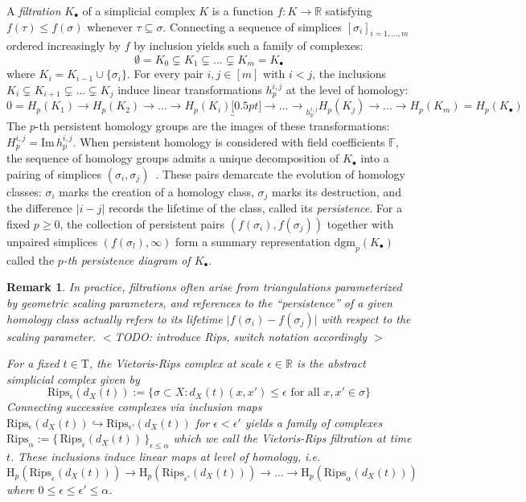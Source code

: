 \documentclass[10pt]{article}
\newtheorem{remark}{Remark}
\begin{document}
A \emph{filtration} $K_\bullet$ of a simplicial complex $K$ is a function $f : K \to \mathbb{R}$ satisfying $f(\tau) \leq f(\sigma)$ whenever $\tau \subseteq \sigma$. Connecting a sequence of simplices $[\sigma_i]_{i=1, \dots, m}$ ordered increasingly by $f$ by inclusion yields such a family of complexes:
\begin{equation}
	\emptyset = K_0 \subsetneq K_1 \subsetneq \dots \subsetneq K_m  = K_\bullet
\end{equation} 
where $K_i  = K_{i-1} \cup \{\sigma_i\}$. For every pair $i,j \in [m]$ with $i < j$, the inclusions $K_i \subsetneq K_{i+1} \subsetneq \dots \subsetneq K_j$ induce linear transformations $h_p^{i,j}$  at the level of homology:
\begin{equation}
	0 = H_p(K_1) \to H_p(K_2) \to \dots \to H_p(K_i) \underbracket[0.5pt]{\to \dots \to}_{h_p^{i,j}} H_p(K_j) \to \dots \to H_p(K_m) = H_p(K_\bullet) 
\end{equation}
The $p$-th persistent homology groups are the images of these transformations: $H_{p}^{i,j} = \mathrm{Im}\,h_p^{i,j}$. 
When persistent homology is considered with field coefficients $\mathbb{F}$, the sequence of homology groups admits a unique decomposition of $K_\bullet$ into a pairing of simplices $(\sigma_i, \sigma_j)$~\cite{}. These pairs demarcate the evolution of homology classes: $\sigma_i$ marks the creation of a homology class, $\sigma_j$ marks its destruction, and the difference $\lvert i - j \rvert$ records the lifetime of the class, called its \emph{persistence}. For a fixed $p \geq 0$, the collection of persistent pairs $(f(\sigma_i), f(\sigma_j))$ together with unpaired simplices $(f(\sigma_l), \infty)$ form a summary representation $\mathrm{dgm}_p(K_\bullet)$ called the \emph{$p$-th persistence diagram of $K_\bullet$}.

\begin{remark}
\normalfont In practice, filtrations often arise from triangulations parameterized by geometric scaling parameters, and references to the ``persistence'' of a given homology class actually refers to its lifetime $\lvert f(\sigma_i) - f(\sigma_j) \rvert$ with respect to the scaling parameter.
$<$TODO: introduce Rips, switch notation accordingly $>$

For a fixed $t \in \mathrm{T}$, the \emph{Vietoris-Rips} complex at scale $\epsilon \in \mathbb{R}$ is the abstract simplicial complex given by 
$$\mathrm{Rips_{\epsilon}}(d_X(t)) := \{ \sigma \subset X : d_X(t)(x, x') \leq \epsilon \text{ for all } x, x' \in \sigma \} $$ 
\noindent Connecting successive complexes via inclusion maps $\mathrm{Rips_{\epsilon}}(d_X(t)) \hookrightarrow \mathrm{Rips_{\epsilon'}}(d_X(t))$ for $\epsilon < \epsilon'$ yields a family of complexes $\mathrm{Rips}_{\alpha} := \{ \, \mathrm{Rips}_\epsilon(d_X(t)) \, \}_{\epsilon \leq \alpha}$ which we call the \emph{Vietoris-Rips filtration at time $t$}. 
These inclusions induce linear maps at level of homology, i.e. 
$$ \mathrm{H}_p(\mathrm{Rips}_{\epsilon}(d_X(t))) \to \mathrm{H}_p(\mathrm{Rips}_{\epsilon'}(d_X(t))) \to \dots \to \mathrm{H}_p(\mathrm{Rips}_{\alpha}(d_X(t)))$$ 
where $0 \leq \epsilon \leq \epsilon' \leq \alpha$. 

\end{remark} 
\end{document}
